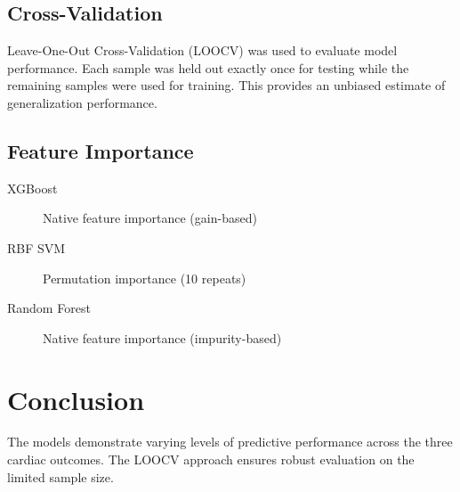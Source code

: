 \documentclass[11pt,a4paper]{article}
\begin{document}
\subsection{Cross-Validation}

Leave-One-Out Cross-Validation (LOOCV) was used to evaluate model performance.
Each sample was held out exactly once for testing while the remaining samples were used for training.
This provides an unbiased estimate of generalization performance.

\subsection{Feature Importance}

\begin{description}
    \item[XGBoost] Native feature importance (gain-based)
    \item[RBF SVM] Permutation importance (10 repeats)
    \item[Random Forest] Native feature importance (impurity-based)
\end{description}

\section{Conclusion}

The models demonstrate varying levels of predictive performance across the three cardiac outcomes.
The LOOCV approach ensures robust evaluation on the limited sample size.
\end{document}
